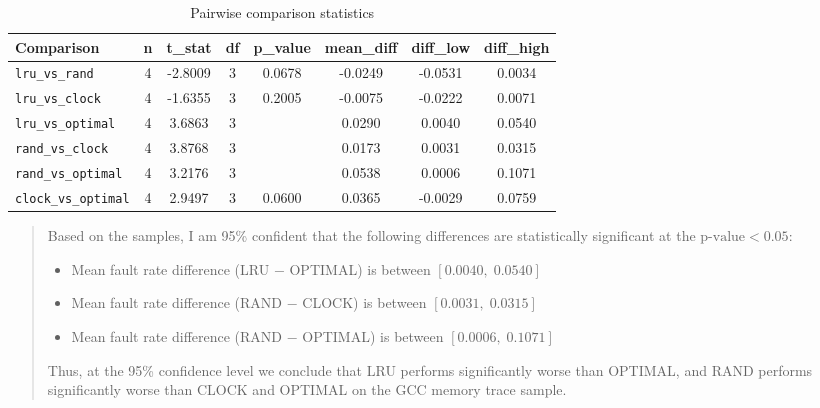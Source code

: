 \documentclass[a4paper, 11pt]{report}
\begin{document}
    \begin{table}[ht]
        \centering
        \label{tab:pairwise}
        \begin{tabular}{l
                        S[table-format=1.0]
                        S[table-format=-2.4]
                        S[table-format=1.0]
                        S[table-format=1.4]
                        S[table-format=1.4]
                        S[table-format=-1.4]
                        S[table-format=1.4]}
            \toprule
            {Comparison} & {n} & {t\_stat} & {df} & {p\_value} & {mean\_diff} & {diff\_low} & {diff\_high} \\
            \midrule
            \texttt{lru\_vs\_rand}     & 4 & -2.8009 & 3 & 0.0678 & -0.0249 & -0.0531 & 0.0034 \\
            \texttt{lru\_vs\_clock}    & 4 & -1.6355 & 3 & 0.2005 & -0.0075 & -0.0222 & 0.0071 \\
            \texttt{lru\_vs\_optimal}  & 4 &  3.6863 & 3 &  &  0.0290 &  0.0040 & 0.0540 \\
            \texttt{rand\_vs\_clock}   & 4 &  3.8768 & 3 &  &  0.0173 &  0.0031 & 0.0315 \\
            \texttt{rand\_vs\_optimal} & 4 &  3.2176 & 3 &  &  0.0538 &  0.0006 & 0.1071 \\
            \texttt{clock\_vs\_optimal}& 4 &  2.9497 & 3 & 0.0600 &  0.0365 & -0.0029 & 0.0759 \\
            \bottomrule
        \end{tabular}
        \caption{Pairwise comparison statistics\cite{psu_paired}}
    \end{table}
    \begin{quote}
        Based on the samples, I am 95\% confident that the following differences are statistically significant at the $\text{p-value}<0.05$\cite{psu_paired}: 
        \begin{itemize}
            \item Mean fault rate difference (LRU $-$ OPTIMAL) is between $[0.0040,\;0.0540]$
            \item Mean fault rate difference (RAND $-$ CLOCK) is between $[0.0031,\;0.0315]$ 
            \item Mean fault rate difference (RAND $-$ OPTIMAL) is between $[0.0006,\;0.1071]$
        \end{itemize}
            Thus, at the 95\% confidence level we conclude that LRU performs significantly worse than OPTIMAL, and RAND performs significantly worse than 
            CLOCK and OPTIMAL on the GCC memory trace sample.
    \end{quote}
\end{document}
